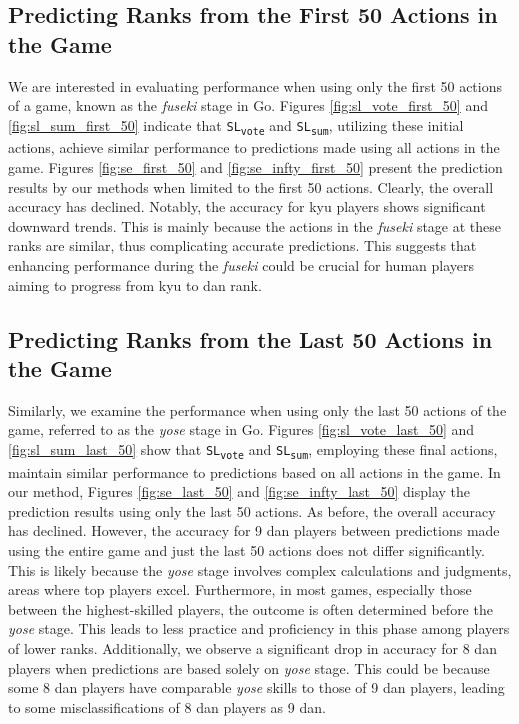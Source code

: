 \subsection{Predicting Ranks from the First 50 Actions in the Game}
\label{subsec:first_50_moves}

We are interested in evaluating performance when using only the first 50 actions of a game, known as the \textit{fuseki} stage in Go. 
Figures \ref{fig:sl_vote_first_50} and \ref{fig:sl_sum_first_50} indicate that \texttt{SL\textsubscript{vote}} and \texttt{SL\textsubscript{sum}}, utilizing these initial actions, achieve similar performance to predictions made using all actions in the game. 
Figures \ref{fig:se_first_50} and \ref{fig:se_infty_first_50} present the prediction results by our methods when limited to the first 50 actions. 
Clearly, the overall accuracy has declined. 
Notably, the accuracy for kyu players shows significant downward trends. 
This is mainly because the actions in the \textit{fuseki} stage at these ranks are similar, thus complicating accurate predictions.
This suggests that enhancing performance during the \textit{fuseki} could be crucial for human players aiming to progress from kyu to dan rank.

\subsection{Predicting Ranks from the Last 50 Actions in the Game}
\label{subsec:last_50_moves}

Similarly, we examine the performance when using only the last 50 actions of the game, referred to as the \textit{yose} stage in Go. 
Figures \ref{fig:sl_vote_last_50} and \ref{fig:sl_sum_last_50} show that \texttt{SL\textsubscript{vote}} and \texttt{SL\textsubscript{sum}}, employing these final actions, maintain similar performance to predictions based on all actions in the game. 
In our method, Figures \ref{fig:se_last_50} and \ref{fig:se_infty_last_50} display the prediction results using only the last 50 actions. 
As before, the overall accuracy has declined. 
However, the accuracy for 9 dan players between predictions made using the entire game and just the last 50 actions does not differ significantly.  
This is likely because the \textit{yose} stage involves complex calculations and judgments, areas where top players excel.
Furthermore, in most games, especially those between the highest-skilled players, the outcome is often determined before the \textit{yose} stage. 
This leads to less practice and proficiency in this phase among players of lower ranks.
Additionally, we observe a significant drop in accuracy for 8 dan players when predictions are based solely on \textit{yose} stage. 
This could be because some 8 dan players have comparable \textit{yose} skills to those of 9 dan players, leading to some misclassifications of 8 dan players as 9 dan.

